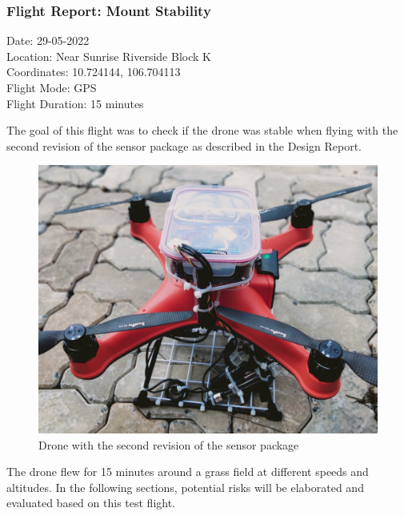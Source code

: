 \newpage
\subsubsection{Flight Report: Mount Stability}
\begin{minipage}{1\textwidth}
	\begin{flushright}
		Date: 29-05-2022\\
		Location: Near Sunrise Riverside Block K\\
		Coordinates: 10.724144, 106.704113\\
		Flight Mode: \gls{GPS}\\
		Flight Duration: 15 minutes\\\vspace{5mm}
	\end{flushright}
\end{minipage}

The goal of this flight was to check if the drone was stable when flying with the second revision of the sensor package as described in the Design Report. \cite{designreport}

\begin{figure}[h]
\centering
\includegraphics[scale=0.4]{080_testing/flights/21_drone.jpg}
\caption{Drone with the second revision of the sensor package}
\end{figure}

The drone flew for 15 minutes around a grass field at different speeds and altitudes. In the following sections, potential risks will be elaborated and evaluated based on this test flight.

